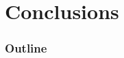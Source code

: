 \section{Conclusions}
    \begin{frame}
    \frametitle{Outline}
    \begin{columns}[T]
        \begin{column}{.45\textwidth}
            \tableofcontents[sections=1-3,currentsection]
        \end{column}
        \begin{column}{.45\textwidth}
            \tableofcontents[sections=4-5,currentsection]
        \end{column}
    \end{columns}
    \end{frame}


